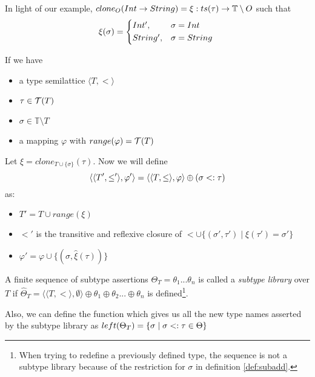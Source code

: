 \documentclass[main.tex]{subfiles}
\begin{document}
\begin{example}
    In light of our example, $clone_O( Int \rightarrow String ) =
    \xi: ts(\tau) \rightarrow \mathbb{T} \setminus O$ such that
    \[ \xi(\sigma) = \begin{cases*}
            Int', & $\sigma = Int$ \\
            String', & $\sigma = String $
        \end{cases*} \]
\end{example}

\begin{defn}
    \label{def:subadd}
    If we have
    \begin{itemize}
        \item a type semilattice $\langle T, \less \rangle$
        \item $\tau \in \mathcal{T}( T )$
        \item $\sigma \in \mathbb{T} \setminus T$
        \item a mapping $\varphi$ with $range(\varphi) = \mathcal{T}( T )$
    \end{itemize}
    Let $\xi = clone_{T \cup \{ \sigma \}}(\tau)$.
    Now we will define \[ \langle \langle T', \leq' \rangle, \varphi' \rangle
        = \langle \langle T, \leq \rangle, \varphi \rangle
        \oplus (\sigma <: \tau) \] as:
    \begin{itemize}
        \item $T' = T \cup range(\xi)$
        \item $\less'$ is the transitive and reflexive closure of
            $\less \cup \{ (\sigma', \tau') \mid \xi(\tau') = \sigma' \}$
        \item $\varphi' = \varphi \cup \{ (\sigma, \hat{\xi}(\tau)) \}$
    \end{itemize}
\end{defn}

\begin{defn}
    A finite sequence of subtype assertions
    $\Theta_T = \theta_1 ... \theta_n$ is called a \emph{subtype library} over $T$
    if $\hat{\Theta}_T = \langle \langle T, \less \rangle, \emptyset \rangle \oplus \theta_1 \oplus \theta_2 ... \oplus \theta_n$
    is defined\footnote{
        When trying to redefine a previously defined type, the sequence is not
        a subtype library because of the restriction for $\sigma$
        in definition \ref{def:subadd}.
    }.

    Also, we can define the function which gives us all the new type names
    asserted by the subtype library as
    $left(\Theta_T) = \{ \sigma \mid \sigma <: \tau \in \Theta \}$
\end{defn}
\end{document}

